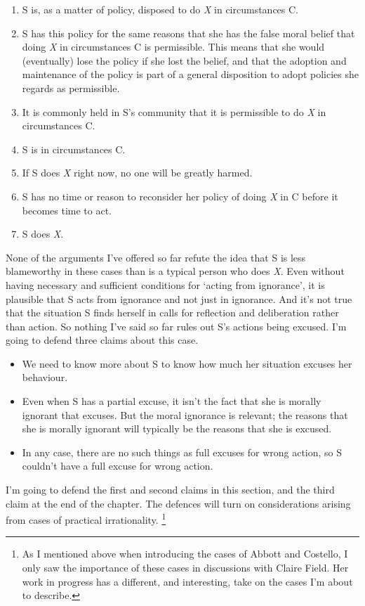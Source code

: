 \begin{enumerate}
\item{} S is, as a matter of policy, disposed to do \emph{X} in circumstances C.

\item{} S has this policy for the same reasons that she has the false moral belief that doing \emph{X} in circumstances C is permissible. This means that she would (eventually) lose the policy if she lost the belief, and that the adoption and maintenance of the policy is part of a general disposition to adopt policies she regards as permissible.

\item{} It is commonly held in S's community that it is permissible to do \emph{X} in circumstances C.

\item{} S is in circumstances C.

\item{} If S does \emph{X} right now, no one will be greatly harmed.

\item{} S has no time or reason to reconsider her policy of doing \emph{X} in C before it becomes time to act.

\item{} S does \emph{X}.

\end{enumerate}
None of the arguments I've offered so far refute the idea that S is less blameworthy in these cases than is a typical person who does \emph{X}. Even without having necessary and sufficient conditions for `acting from ignorance', it is plausible that S acts from ignorance and not just in ignorance. And it's not true that the situation S finds herself in calls for reflection and deliberation rather than action. So nothing I've said so far rules out S's actions being excused. I'm going to defend three claims about this case.

\begin{itemize}
\item{} We need to know more about S to know how much her situation excuses her behaviour.

\item{} Even when S has a partial excuse, it isn't the fact that she is morally ignorant that excuses. But the moral ignorance is relevant; the reasons that she is morally ignorant will typically be the reasons that she is excused.

\item{} In any case, there are no such things as full excuses for wrong action, so S couldn't have a full excuse for wrong action.

\end{itemize}
I'm going to defend the first and second claims in this section, and the third claim at the end of the chapter. The defences will turn on considerations arising from cases of practical irrationality. \footnote{As I mentioned above when introducing the cases of \gls{Abbott} and \gls{Costello}, I only saw the importance of these cases in discussions with Claire Field. Her work in progress has a different, and interesting, take on the cases I'm about to describe.}

